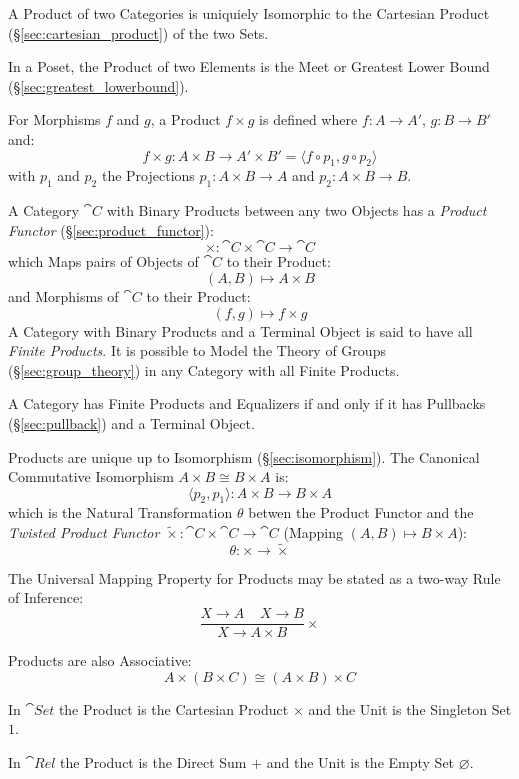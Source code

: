 A Product of two Categories is uniquiely Isomorphic to the Cartesian
Product (\S\ref{sec:cartesian_product}) of the two Sets.

In a Poset, the Product of two Elements is the Meet or Greatest Lower
Bound (\S\ref{sec:greatest_lowerbound}).

For Morphisms $f$ and $g$, a Product $f \times g$ is defined where $f
: A \rightarrow A'$, $g : B \rightarrow B'$ and:
\[
  f \times g : A \times B \rightarrow A' \times B' =
  \langle f \circ p_1, g \circ p_2 \rangle
\]
with $p_1$ and $p_2$ the Projections $p_1 : A \times B \rightarrow A$
and $p_2 : A \times B \rightarrow B$.

A Category $\cat{C}$ with Binary Products between any two Objects
has a \emph{Product Functor} (\S\ref{sec:product_functor}):
\[
  \times : \cat{C} \times \cat{C} \rightarrow \cat{C}
\]
which Maps pairs of Objects of $\cat{C}$ to their Product:
\[
  (A,B) \mapsto A \times B
\]
and Morphisms of $\cat{C}$ to their Product:
\[
  (f,g) \mapsto f \times g
\]
A Category with Binary Products and a Terminal Object is said to have
all \emph{Finite Products}. It is possible to Model the Theory of
Groups (\S\ref{sec:group_theory}) in any Category with all Finite
Products.

A Category has Finite Products and Equalizers if and only if it has
Pullbacks (\S\ref{sec:pullback}) and a Terminal Object. \cite{awodey06}

Products are unique up to Isomorphism (\S\ref{sec:isomorphism}). The
Canonical Commutative Isomorphism $A \times B \cong B \times A$ is:
\[
  \langle p_2, p_1 \rangle : A \times B \rightarrow B \times A
\]
which is the Natural Transformation $\theta$ betwen the Product
Functor and the \emph{Twisted Product Functor} $\tilde{\times} :
\cat{C} \times \cat{C} \rightarrow \cat{C}$ (Mapping $(A,B)
\mapsto B \times A$):
\[
  \theta : \times \rightarrow \tilde{\times}
\]

The Universal Mapping Property for Products may be stated as a two-way
Rule of Inference:
\[
  {
    \frac{X \rightarrow A \;\;\;\; X \rightarrow B}
    {X \rightarrow A \times B}
  }\times
\]

Products are also Associative:
\[
  A \times (B \times C) \cong (A \times B) \times C
\]

In $\cat{Set}$ the Product is the Cartesian Product $\times$ and the
Unit is the Singleton Set $1$.

In $\cat{Rel}$ the Product is the Direct Sum $+$ and the Unit is
the Empty Set $\varnothing$.

